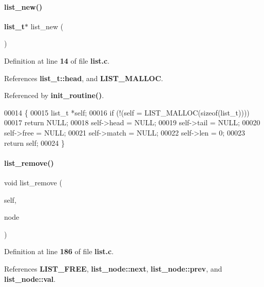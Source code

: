 \paragraph{list\+\_\+new()}
{\footnotesize\ttfamily \textbf{ list\+\_\+t}$\ast$ list\+\_\+new (\begin{DoxyParamCaption}{ }\end{DoxyParamCaption})}



Definition at line \textbf{ 14} of file \textbf{ list.\+c}.



References \textbf{ list\+\_\+t\+::head}, and \textbf{ L\+I\+S\+T\+\_\+\+M\+A\+L\+L\+OC}.



Referenced by \textbf{ init\+\_\+routine()}.


\begin{DoxyCode}
00014                    \{
00015   list_t *\textcolor{keyword}{self};
00016   \textcolor{keywordflow}{if} (!(\textcolor{keyword}{self} = LIST_MALLOC(\textcolor{keyword}{sizeof}(list_t))))
00017     \textcolor{keywordflow}{return} NULL;
00018   \textcolor{keyword}{self}->head = NULL;
00019   \textcolor{keyword}{self}->tail = NULL;
00020   \textcolor{keyword}{self}->free = NULL;
00021   \textcolor{keyword}{self}->match = NULL;
00022   \textcolor{keyword}{self}->len = 0;
00023   \textcolor{keywordflow}{return} \textcolor{keyword}{self};
00024 \}
\end{DoxyCode}
\mbox{\label{a00110_a5ef7843a8a481124bce3e93541ba379a}} 
\paragraph{list\+\_\+remove()}
{\footnotesize\ttfamily void list\+\_\+remove (\begin{DoxyParamCaption}\item[{\textbf{ list\+\_\+t} $\ast$}]{self,  }\item[{\textbf{ list\+\_\+node\+\_\+t} $\ast$}]{node }\end{DoxyParamCaption})}



Definition at line \textbf{ 186} of file \textbf{ list.\+c}.



References \textbf{ L\+I\+S\+T\+\_\+\+F\+R\+EE}, \textbf{ list\+\_\+node\+::next}, \textbf{ list\+\_\+node\+::prev}, and \textbf{ list\+\_\+node\+::val}.


